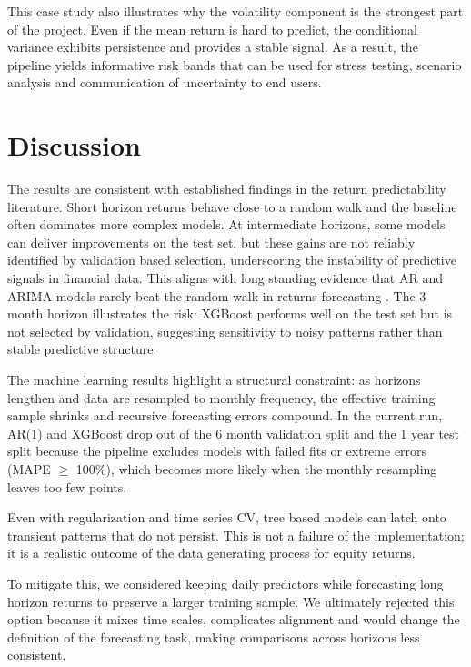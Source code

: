 \documentclass[11pt,a4paper]{article}
\begin{document}
\noindent This case study also illustrates why the volatility component is the strongest part of the project. Even if the mean return is hard to predict, the conditional variance exhibits persistence and provides a stable signal. As a result, the pipeline yields informative risk bands that can be used for stress testing, scenario analysis and communication of uncertainty to end users.
\endgroup

\section{Discussion}
\label{sec:discussion}
\begingroup
\setlength{\parskip}{0.5\baselineskip}
\setlength{\parindent}{1.25em}

\hspace*{\parindent}The results are consistent with established findings in the return predictability literature. Short horizon returns behave close to a random walk and the baseline often dominates more complex models. At intermediate horizons, some models can deliver improvements on the test set, but these gains are not reliably identified by validation based selection, underscoring the instability of predictive signals in financial data. This aligns with long standing evidence that AR and ARIMA models rarely beat the random walk in returns forecasting \parencite{Fama1970,Campbell1997,Hansen2005}. The 3 month horizon illustrates the risk: XGBoost performs well on the test set but is not selected by validation, suggesting sensitivity to noisy patterns rather than stable predictive structure.

\noindent The machine learning results highlight a structural constraint: as horizons lengthen and data are resampled to monthly frequency, the effective training sample shrinks and recursive forecasting errors compound. In the current run, AR(1) and XGBoost drop out of the 6 month validation split and the 1 year test split because the pipeline excludes models with failed fits or extreme errors (MAPE $\geq$ 100\%), which becomes more likely when the monthly resampling leaves too few points.

\noindent Even with regularization and time series CV, tree based models can latch onto transient patterns that do not persist. This is not a failure of the implementation; it is a realistic outcome of the data generating process for equity returns.

\noindent To mitigate this, we considered keeping daily predictors while forecasting long horizon returns to preserve a larger training sample. We ultimately rejected this option because it mixes time scales, complicates alignment and would change the definition of the forecasting task, making comparisons across horizons less consistent.
\end{document}
